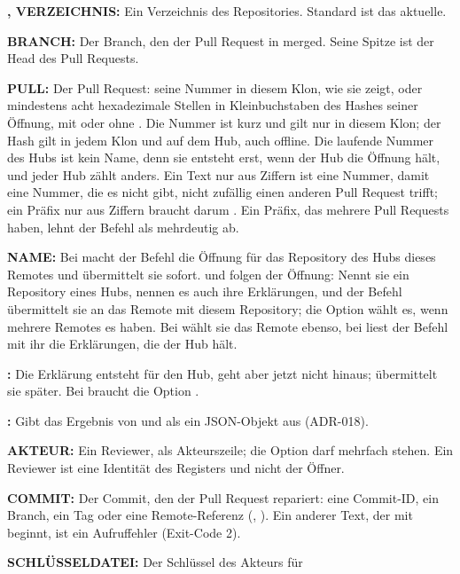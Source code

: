 \startitemize
\item {\bf {},  VERZEICHNIS:} Ein Verzeichnis des Repositories.
Standard ist das aktuelle.
\item {\bf BRANCH:} Der Branch, den der Pull Request in  merged. Seine Spitze ist der
Head des Pull Requests.
\item {\bf PULL:} Der Pull Request: seine Nummer in diesem Klon, wie  sie zeigt,
oder mindestens acht hexadezimale Stellen in Kleinbuchstaben des Hashes seiner Öffnung, mit oder
ohne . Die Nummer ist kurz und gilt nur in diesem Klon; der Hash gilt in jedem Klon
und auf dem Hub, auch offline. Die laufende Nummer des Hubs ist kein Name, denn sie entsteht
erst, wenn der Hub die Öffnung hält, und jeder Hub zählt anders. Ein Text nur aus Ziffern ist
eine Nummer, damit eine Nummer, die es nicht gibt, nicht zufällig einen anderen Pull Request
trifft; ein Präfix nur aus Ziffern braucht darum . Ein Präfix, das mehrere Pull
Requests haben, lehnt der Befehl als mehrdeutig ab.
\item {\bf {} NAME:} Bei  macht der Befehl die Öffnung für das
Repository des Hubs dieses Remotes und übermittelt sie sofort.  und 
folgen der Öffnung: Nennt sie ein Repository eines Hubs, nennen es auch ihre Erklärungen, und der
Befehl übermittelt sie an das Remote mit diesem Repository; die Option wählt es, wenn mehrere
Remotes es haben. Bei  wählt sie das Remote ebenso, bei  liest der
Befehl mit ihr die Erklärungen, die der Hub hält.
\item {\bf {}:} Die Erklärung entsteht für den Hub, geht aber jetzt nicht hinaus;
 übermittelt sie später. Bei  braucht die Option .
\item {\bf {}:} Gibt das Ergebnis von  und  als ein
JSON-Objekt aus (ADR-018).
\item {\bf {} AKTEUR:} Ein Reviewer, als Akteurszeile; die Option darf mehrfach
stehen. Ein Reviewer ist eine Identität des Registers und nicht der Öffner.
\item {\bf {} COMMIT:} Der Commit, den der Pull Request repariert: eine
Commit-ID, ein Branch, ein Tag oder eine Remote-Referenz
(, ).
Ein anderer Text, der mit  beginnt, ist ein Aufruffehler (Exit-Code 2).
\item {\bf {} SCHLÜSSELDATEI:} Der Schlüssel des Akteurs für

